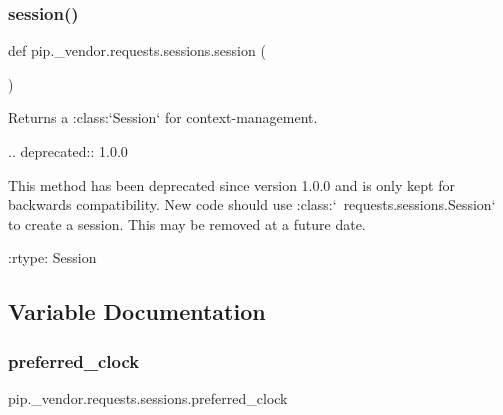\subsubsection{\texorpdfstring{session()}{session()}}
{\footnotesize\ttfamily def pip.\+\_\+vendor.\+requests.\+sessions.\+session (\begin{DoxyParamCaption}{ }\end{DoxyParamCaption})}

\begin{DoxyVerb}Returns a :class:`Session` for context-management.

.. deprecated:: 1.0.0

    This method has been deprecated since version 1.0.0 and is only kept for
    backwards compatibility. New code should use :class:`~requests.sessions.Session`
    to create a session. This may be removed at a future date.

:rtype: Session
\end{DoxyVerb}
 

\subsection{Variable Documentation}
\mbox{\label{namespacepip_1_1__vendor_1_1requests_1_1sessions_a0618d2af0b89575673584b3f3a7ec0c4}} 
\subsubsection{\texorpdfstring{preferred\+\_\+clock}{preferred\_clock}}
{\footnotesize\ttfamily pip.\+\_\+vendor.\+requests.\+sessions.\+preferred\+\_\+clock}

